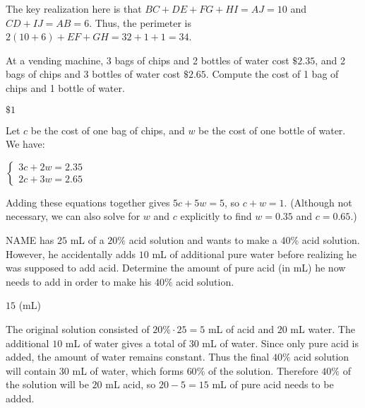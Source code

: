 \documentclass[11pt]{article}
\begin{document}
\begin{solution}
The key realization here is that $BC+DE+FG+HI = AJ = 10$ and $CD+IJ = AB = 6$. Thus, the perimeter is $2(10+6) + EF+GH=32 + 1 + 1 = \boxed{34}$.
\end{solution}


\begin{problem}
At a vending machine, 3 bags of chips and 2 bottles of water cost $\$2.35$, and 2 bags of chips and 3 bottles of water cost $\$2.65$. Compute the cost of 1 bag of chips and 1 bottle of water.
\end{problem}

\begin{answer}
$\boxed{\$1}$
\end{answer}

\begin{solution}
Let $c$ be the cost of one bag of chips, and $w$ be the cost of one bottle of water. We have: \begin{center}$\begin{cases} 3c + 2w = 2.35 \\ 2c + 3w = 2.65 \end{cases}$\end{center} Adding these equations together gives $5c + 5w = 5$, so $c + w = \boxed{1}$. (Although not necessary, we can also solve for $w$ and $c$ explicitly to find $w = 0.35$ and $c = 0.65$.)
\end{solution}


\begin{problem}
NAME has $25$ mL of a $20\%$ acid solution and wants to make a $40\%$ acid solution. However, he accidentally adds $10$ mL of additional pure water before realizing he was supposed to add acid. Determine the amount of pure acid (in mL) he now needs to add in order to make his $40\%$ acid solution.
\end{problem}

\begin{answer}
$\boxed{15}$ (mL)
\end{answer}

\begin{solution}
The original solution consisted of $20\% \cdot 25 = 5$ mL of acid and $20$ mL water. The additional $10$ mL of water gives a total of $30$ mL of water. Since only pure acid is added, the amount of water remains constant. Thus the final $40\%$ acid solution will contain $30$ mL of water, which forms $60\%$ of the solution. Therefore $40\%$ of the solution will be $20$ mL acid, so $20 - 5 = \boxed{15}$ mL of pure acid needs to be added.
\end{solution}
\end{document}
